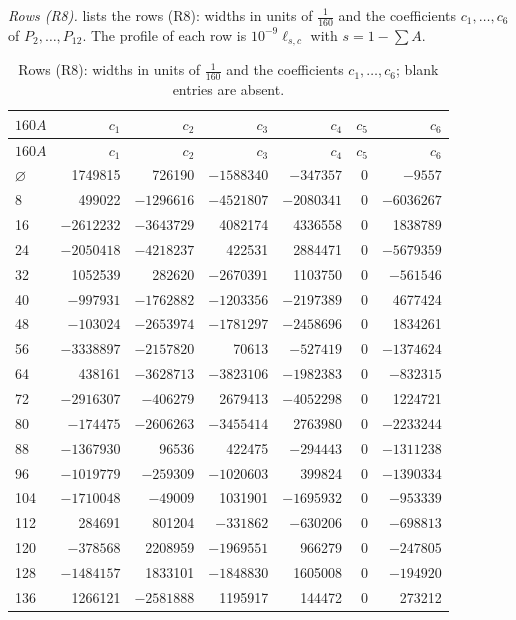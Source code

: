 \documentclass[11pt,colorlinks]{charlie}
\begin{document}
\emph{Rows (R8).}  lists the rows (R8): widths in units of $\frac1{160}$ and the coefficients $c_1,\dots,c_6$ of $P_2,\dots,P_{12}$. The profile of each row is $10^{-9}\ell_{s,c}$ with $s=1-\sum A$.

{\small
\begin{longtable}{@{}l rrrrrr@{}}
\caption{Rows (R8): widths in units of $\frac1{160}$ and the coefficients $c_1,\dots,c_6$; blank entries are absent.}\label{tab:mixed}\\
\toprule $160A$ & $c_1$ & $c_2$ & $c_3$ & $c_4$ & $c_5$ & $c_6$\\\midrule\endfirsthead
\toprule $160A$ & $c_1$ & $c_2$ & $c_3$ & $c_4$ & $c_5$ & $c_6$\\\midrule\endhead
$\varnothing$ & 1749815 & 726190 & $-1588340$ & $-347357$ & 0 & $-9557$\\
8 & 499022 & $-1296616$ & $-4521807$ & $-2080341$ & 0 & $-6036267$\\
16 & $-2612232$ & $-3643729$ & 4082174 & 4336558 & 0 & 1838789\\
24 & $-2050418$ & $-4218237$ & 422531 & 2884471 & 0 & $-5679359$\\
32 & 1052539 & 282620 & $-2670391$ & 1103750 & 0 & $-561546$\\
40 & $-997931$ & $-1762882$ & $-1203356$ & $-2197389$ & 0 & 4677424\\
48 & $-103024$ & $-2653974$ & $-1781297$ & $-2458696$ & 0 & 1834261\\
56 & $-3338897$ & $-2157820$ & 70613 & $-527419$ & 0 & $-1374624$\\
64 & 438161 & $-3628713$ & $-3823106$ & $-1982383$ & 0 & $-832315$\\
72 & $-2916307$ & $-406279$ & 2679413 & $-4052298$ & 0 & 1224721\\
80 & $-174475$ & $-2606263$ & $-3455414$ & 2763980 & 0 & $-2233244$\\
88 & $-1367930$ & 96536 & 422475 & $-294443$ & 0 & $-1311238$\\
96 & $-1019779$ & $-259309$ & $-1020603$ & 399824 & 0 & $-1390334$\\
104 & $-1710048$ & $-49009$ & 1031901 & $-1695932$ & 0 & $-953339$\\
112 & 284691 & 801204 & $-331862$ & $-630206$ & 0 & $-698813$\\
120 & $-378568$ & 2208959 & $-1969551$ & 966279 & 0 & $-247805$\\
128 & $-1484157$ & 1833101 & $-1848830$ & 1605008 & 0 & $-194920$\\
136 & 1266121 & $-2581888$ & 1195917 & 144472 & 0 & 273212\\

\end{longtable}}
\end{document}
